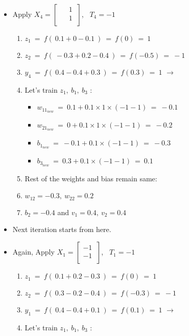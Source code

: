 \documentclass[12pt]{article}
\begin{document}
\begin{itemize}
{		}
	
	
	\item Apply $X_4 = \begin{bmatrix}
		\phantom{-}1\ \\ 	
		\phantom{-}1\ \\ 	
	\end{bmatrix}$, \  $T_4 = -1$
	
	{	
		\begin{enumerate}
			\item $z_1 \ = \ f(\ 0.1  +  0 - 0.1 \ ) \ = \ f(0) \ = \ 1$
			\item $z_2 \ = \ f(\ -0.3 + 0.2 - 0.4 \ ) \ = \ f(-0.5) \ = \ -1$
			\item $y_4 \ = \ f (\ 0.4 - 0.4 + 0.3 \ )\ = \ f(0.3)  \ = \ 1$ $\rightarrow$ 
			\item Let's train $z_1,\ b_1,\ b_3$ :
			
				\begin{itemize}[label=$\rightarrow$]
					\item $w_{11_{new}}  \ = \ 0.1 + 0.1 \times 1 \times (-1-1) \ = \ -0.1$
					\item $w_{21_{new}}  \ = \ 0 + 0.1 \times 1 \times (-1-1) \ = \ -0.2$
					\item $b_{1_{new}} \ = \ -0.1 + 0.1 \times (-1-1) \ = \ -0.3$
					\item $b_{3_{new}} \ = \ 0.3 + 0.1 \times (-1-1) \ = \ 0.1$
				\end{itemize}
			
			\item Rest of the weights and bias remain same: 
			\item $w_{12} = -0.3,\  w_{22} = 0.2$  
			\item $b_2 = -0.4$ and $v_1 = 0.4, \ v_2 = 0.4$
		\end{enumerate}
		
	}
	
	\item Next iteration starts from here.
	
	\item Again, Apply $X_1 = \begin{bmatrix}
		-1\ \\ 	
		-1\ \\ 	
	\end{bmatrix}$, \  $T_1 = -1$
	
	{	
		\begin{enumerate}
			\item $z_1 \ = \ f(\ 0.1  +  0.2 - 0.3 \ ) \ = \ f(0) \ = \ 1$
			\item $z_2 \ = \ f(\ 0.3 -  0.2 - 0.4 \ ) \ = \ f(-0.3) \ = \ -1$
			\item $y_1 \ = \ f (\ 0.4 - 0.4 + 0.1 \ )\ = \ f(0.1)  \ = \ 1$ $\rightarrow$ 
			\item Let's train $z_1,\ b_1,\ b_3$ :
			

\end{enumerate}}
\end{itemize}
\end{document}
